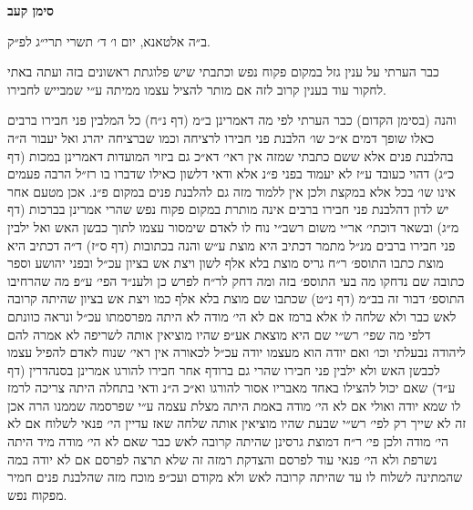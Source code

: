 \documentclass[12pt, openany]{book}
\newcommand{\chapname}{}
\newcommand{\newchap}[1]{
	\addcontentsline{toc}{chapter}{#1}
	\renewcommand{\chapname}{#1}
		\begin{center}
			\textbf{%
\fontsize{16pt}{16pt}\selectfont
				#1}
		\end{center}
}
\begin{document}
\newchap{סימן קעב}
\begin{multicols}{2}
ב״ה אלטאנא, יום ו׳ ד׳ תשרי תרי״ג לפ״ק.\\\vspace{0pt}

כבר הערתי על ענין גזל במקום פקוח נפש וכתבתי שיש פלוגתת ראשונים בזה ועתה באתי לחקור עוד בענין קרוב לזה אם מותר להציל עצמו ממיתה ע״י שמבייש לחבירו.\\\vspace{0pt}

והנה (בסימן הקדום) כבר הערתי לפי מה דאמרינן ב״מ (דף נ״ח) כל המלבין פני חבירו ברבים כאלו שופך דמים א״כ שו׳ הלבנת פני חבירו לרציחה וכמו שברציחה יהרג ואל יעבור ה״ה בהלבנת פנים אלא ששם כתבתי שמזה אין ראי׳ דא״כ גם ביזוי המועדות דאמרינן במכות (דף כ״ג) דהוי כעובד ע״ז לא יעמוד בפני פ״נ אלא ודאי דלשון כאילו שדברו בו רז״ל הרבה פעמים אינו שו׳ בכל אלא במקצת ולכן אין ללמוד מזה גם להלבנת פנים במקום פ״נ. אכן מטעם אחר יש לדון דהלבנת פני חבירו ברבים אינה מותרת במקום פקוח נפש שהרי אמרינן בברכות (דף מ״ג) ובשאר דוכתי׳ אר״י משום רשב״י נוח לו לאדם שימסור עצמו לתוך כבשן האש ואל ילבין פני חבירו ברבים מנ״ל מתמר דכתיב היא מוצת ע״ש והנה בכתובות (דף ס״ז) ד״ה דכתיב היא מוצת כתבו התוספ׳ ר״ח גריס מוצת בלא אלף לשון ויצת אש בציון עכ״ל ובפני יהושע וספר כתובה שם נדחקו מה בעי התוספ׳ בזה ומה דחק לר״ח לפרש כן ולענ״ד הפי׳ ע״פ מה שהרחיבו התוספ׳ דבור זה בב״מ (דף נ״ט) שכתבו שם מוצת בלא אלף כמו ויצת אש בציון שהיתה קרובה לאש כבר ולא שלחה לו אלא ברמז אם לא הי׳ מודה לא היתה מפרסמתו עכ״ל ונראה כוונתם דלפי מה שפי׳ רש״י שם היא מוצאת אע״פ שהיו מוציאין אותה לשריפה לא אמרה להם ליהודה נבעלתי וכו׳ ואם יודה הוא מעצמו יודה עכ״ל לכאורה אין ראי׳ שנוח לאדם להפיל עצמו לכבשן האש ולא ילבין פני חבירו שהרי גם ברודף אחר חבירו להורגו אמרינן בסנהדרין (דף ע״ד) שאם יכול להצילו באחד מאבריו אסור להורגו וא״כ ה״נ ודאי בתחלה היתה צריכה לרמז לו שמא יודה ואולי אם לא הי׳ מודה באמת היתה מצלת עצמה ע״י שפרסמה שממנו הרה אכן זה לא שייך רק לפי׳ רש״י שבעת שהיו מוציאין אותה שלחה שאז עדיין הי׳ פנאי לשלוח אם לא הי׳ מודה ולכן פי׳ ר״ח דמוצת גרסינן שהיתה קרובה לאש כבר שאם לא הי׳ מודה מיד היתה נשרפת ולא הי׳ פנאי עוד לפרסם והצדקת רמזה זה שלא תרצה לפרסם אם לא יודה במה שהמתינה לשלוח לו עד שהיתה קרובה לאש ולא מקודם ועכ״פ מוכח מזה שהלבנת פנים חמיר מפקוח נפש.\\\vspace{0pt}


\end{multicols}
\end{document}
